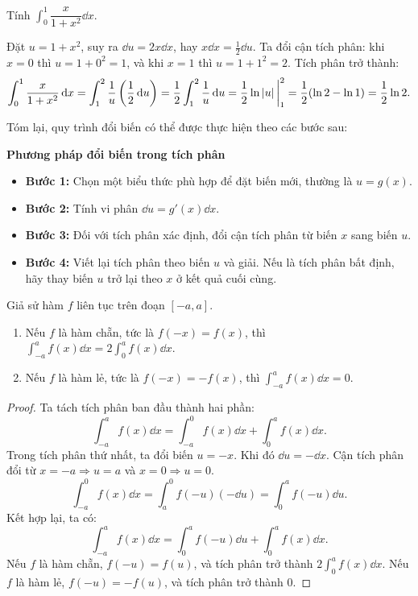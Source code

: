 \begin{example}
    Tính $\int_0^1 \dfrac{x}{1+x^2} \dd x$.
\end{example}
\begin{solution}
    Đặt $u = 1+x^2$, suy ra $\dd u = 2x \dd x$, hay $x\dd x = \frac{1}{2}\dd u$. Ta đổi cận tích phân: khi $x=0$ thì $u=1+0^2=1$, và khi $x=1$ thì $u=1+1^2=2$. Tích phân trở thành:
    \[
        \int_0^1 \dfrac{x}{1+x^2} \,\mathrm{d} x = \int_1^2 \dfrac{1}{u} \left(\dfrac{1}{2}\,\mathrm{d} u\right) = \dfrac{1}{2} \int_1^2 \dfrac{1}{u}\,\mathrm{d} u = \dfrac{1}{2}\ln\left\lvert u \right\rvert\bigg|_1^2 = \dfrac{1}{2}(\ln 2 - \ln 1) = \dfrac{1}{2}\ln 2.
    \]
\end{solution}

Tóm lại, quy trình đổi biến có thể được thực hiện theo các bước sau:
\begin{importantbox}
    \textbf{Phương pháp đổi biến trong tích phân}
    \begin{itemize}
        \item \textbf{Bước 1:} Chọn một biểu thức phù hợp để đặt biến mới, thường là $u = g(x)$.
        \item \textbf{Bước 2:} Tính vi phân $\dd u = g'(x) \dd x$.
        \item \textbf{Bước 3:} Đối với tích phân xác định, đổi cận tích phân từ biến $x$ sang biến $u$.
        \item \textbf{Bước 4:} Viết lại tích phân theo biến $u$ và giải. Nếu là tích phân bất định, hãy thay biến $u$ trở lại theo $x$ ở kết quả cuối cùng.
    \end{itemize}

\end{importantbox}

\begin{proposition}
    Giả sử hàm $f$ liên tục trên đoạn $[-a, a]$.
    \begin{enumerate}[label=(\alph*)]
        \item Nếu $f$ là hàm chẵn, tức là $f(-x) = f(x)$, thì $\int_{-a}^a f(x) \dd x = 2 \int_0^a f(x) \dd x$.
        \item Nếu $f$ là hàm lẻ, tức là $f(-x) = -f(x)$, thì $\int_{-a}^a f(x) \dd x = 0$.
    \end{enumerate}
\end{proposition}
\begin{proof}
    Ta tách tích phân ban đầu thành hai phần:
    \[
        \int_{-a}^a f(x) \dd x = \int_{-a}^0 f(x) \dd x + \int_0^a f(x) \dd x.
    \]
    Trong tích phân thứ nhất, ta đổi biến $u = -x$. Khi đó $\dd u = -\dd x$. Cận tích phân đổi từ $x=-a \Rightarrow u=a$ và $x=0 \Rightarrow u=0$.
    \[
        \int_{-a}^0 f(x) \dd x = \int_{a}^{0} f(-u) (-\dd u) = \int_0^a f(-u) \dd u.
    \]
    Kết hợp lại, ta có:
    \[
        \int_{-a}^a f(x) \dd x = \int_0^a f(-u) \dd u + \int_0^a f(x) \dd x.
    \]
    Nếu $f$ là hàm chẵn, $f(-u) = f(u)$, và tích phân trở thành $2 \int_0^a f(x) \dd x$. Nếu $f$ là hàm lẻ, $f(-u) = -f(u)$, và tích phân trở thành $0$.
\end{proof}

